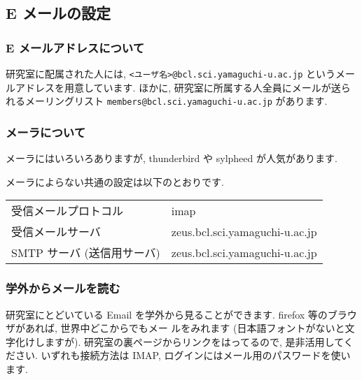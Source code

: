 \documentclass{jarticle}
\begin{document}
\subsection{E メールの設定}

\subsubsection{E メールアドレスについて}

研究室に配属された人には, \verb|<ユーザ名>@bcl.sci.yamaguchi-u.ac.jp|
というメールアドレスを用意しています.
ほかに, 研究室に所属する人全員にメールが送られるメーリングリスト
\verb|members@bcl.sci.yamaguchi-u.ac.jp| があります.

\subsubsection{メーラについて}
メーラにはいろいろありますが, thunderbird や sylpheed が人気があります.

メーラによらない共通の設定は以下のとおりです.

\begin{tabular}[t]{ll}\hline
受信メールプロトコル & imap\\
受信メールサーバ & zeus.bcl.sci.yamaguchi-u.ac.jp\\
SMTP サーバ (送信用サーバ)& zeus.bcl.sci.yamaguchi-u.ac.jp\\\hline
\end{tabular}

\subsubsection{学外からメールを読む}

研究室にとどいている Email を学外から見ることができます.
firefox 等のブラウザがあれば, 世界中どこからでもメー
ルをみれます (日本語フォントがないと文字化けしますが).
研究室の裏ページからリンクをはってるので, 是非活用してください.
いずれも接続方法は IMAP, ログインにはメール用のパスワードを使います.
\end{document}
